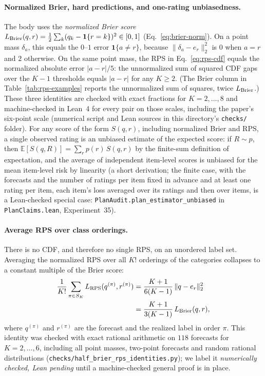 \paragraph{Normalized Brier, hard predictions, and one-rating unbiasedness.}
The body uses the \emph{normalized Brier score}
$L_{\rm Brier}(q,r)=\frac12\sum_k(q_k-\mathbf{1}\{r=k\})^2\in[0,1]$
(Eq.~\ref{eq:brier-norm}).
On a point mass $\delta_a$, this equals the $0$--$1$ error $\mathbf{1}\{a\neq r\}$, because $\lVert\delta_a-e_r\rVert_2^2$ is $0$ when $a=r$ and $2$ otherwise.
On the same point mass, the RPS in Eq.~\ref{eq:rps-cdf} equals the normalized absolute error $\lvert a-r\rvert/5$: the unnormalized sum of squared CDF gaps over the $K-1$ thresholds equals $\lvert a-r\rvert$ for any $K\ge 2$.
(The Brier column in Table~\ref{tab:rps-examples} reports the unnormalized sum of squares, twice $L_{\rm Brier}$.)
These three identities are checked with exact fractions for $K=2,\ldots,8$ and machine-checked in Lean~4 for every pair on those scales, including the paper's six-point scale (numerical script and Lean sources in this directory's \texttt{checks/} folder).
For any score of the form $S(q,r)$, including normalized Brier and RPS, a single observed rating is an unbiased estimate of the expected score: if $R\sim p$, then $\mathbb{E}[S(q,R)]=\sum_r p(r)\,S(q,r)$ by the finite-sum definition of expectation, and the average of independent item-level scores is unbiased for the mean item-level risk by linearity (a short derivation; the finite case, with the forecasts and the number of ratings per item fixed in advance and at least one rating per item, each item's loss averaged over its ratings and then over items, is a Lean-checked special case: \texttt{PlanAudit.plan\_\allowbreak estimator\_\allowbreak unbiased} in \texttt{PlanClaims.lean}, Experiment~35).

\paragraph{Average RPS over class orderings.}
There is no CDF, and therefore no single RPS, on an unordered label set.
Averaging the normalized RPS over all $K!$ orderings of the categories collapses to a constant multiple of the Brier score:
\begin{equation}
\begin{aligned}
\frac{1}{K!}\sum_{\pi\in S_K} L_{\rm RPS}(q^{(\pi)},r^{(\pi)})
&=\frac{K+1}{6(K-1)}\,\lVert q-e_r\rVert_2^2 \\
&=\frac{K+1}{3(K-1)}\,L_{\rm Brier}(q,r),
\end{aligned}
\label{eq:avg-rps-brier}
\end{equation}
where $q^{(\pi)}$ and $r^{(\pi)}$ are the forecast and the realized label in order $\pi$.
This identity was checked with exact rational arithmetic on $118$ forecasts for $K=2,\ldots,6$, including all point masses, two-point forecasts and random rational distributions (\texttt{checks/half\_brier\_rps\_identities.py}); we label it \emph{numerically checked, Lean pending} until a machine-checked general proof is in place.
